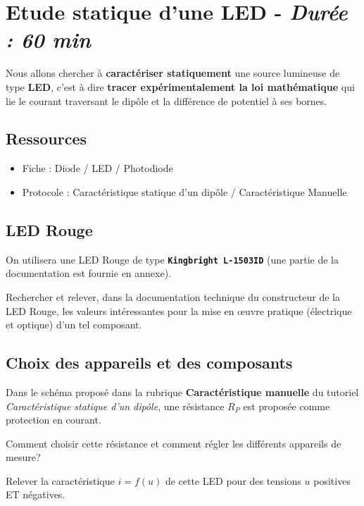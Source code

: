 \clearpage
\section{Etude statique d'une LED - \textit{Durée : 60 min}}

Nous allons chercher à \textbf{caractériser statiquement} une source lumineuse de type \textbf{LED}, c'est à dire \textbf{tracer expérimentalement la loi mathématique} qui lie le courant traversant le dipôle et la différence de potentiel à ses bornes.


\subsection{Ressources}

\begin{itemize}
	\item Fiche : Diode / LED / Photodiode
	\item Protocole : Caractéristique statique d'un dipôle / Caractéristique Manuelle
\end{itemize}

\subsection{LED Rouge}

On utilisera une LED Rouge de type \textbf{\texttt{Kingbright L-1503ID}} (une partie de la documentation est fournie en annexe).

\Quest Rechercher et relever, dans la documentation technique du constructeur de la LED Rouge, les valeurs intéressantes pour la mise en \oe{}uvre pratique (électrique et optique) d'un tel composant.


\subsection{Choix des appareils et des composants}

Dans le schéma proposé dans la rubrique \textbf{Caractéristique manuelle} du tutoriel \textit{Caractéristique statique d'un dipôle}, une résistance $R_P$ est proposée comme protection en courant.

\Quest Comment choisir cette résistance et comment régler les différents appareils de mesure?

\Manip Relever la caractéristique $i=f(u)$ de cette LED pour des tensions $u$ positives ET négatives. 

